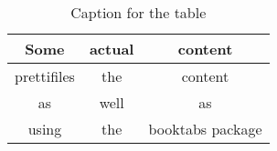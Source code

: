 \documentclass{article}
\begin{document}
	\begin{table}[h!]
		\centering
		\caption{Caption for the table}
		\label{tab:table1}
		\begin{tabular}{ccc}
			\toprule
			Some & actual & content\\
			\midrule
			prettifiles & the & content\\
			as & well & as\\
			using & the & booktabs package\\
			\bottomrule
		\end{tabular}
	\end{table}
\end{document}
